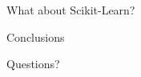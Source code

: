 \documentclass{beamer}
\begin{document}
\begin{frame}{What about Scikit-Learn?}
\end{frame}


\begin{frame}{Conclusions}
\end{frame}


\appendix

\begin{frame}
\begin{center}
{\Huge  Questions?}
\end{center}
\end{frame}
\end{document}
